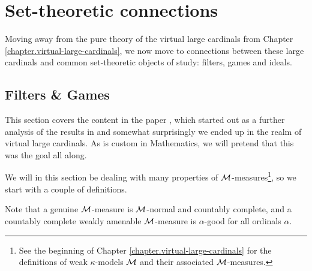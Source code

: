 \documentclass[../../main]{subfiles}
\begin{document}
\chapter{Set-theoretic connections}
\label{chapter.set-theoretic-connections}
\thispagestyle{fancy}

Moving away from the pure theory of the virtual large cardinals from Chapter \ref{chapter.virtual-large-cardinals}, we now move to connections between these large cardinals and common set-theoretic objects of study: filters, games and ideals.

\section{Filters \& Games}

This section covers the content in the paper \cite{NielsenWelch}, which started out as a further analysis of the results in \cite{HolySchlicht} and somewhat surprisingly we ended up in the realm of virtual large cardinals. As is custom in Mathematics, we will pretend that this was the goal all along.

\qquad We will in this section be dealing with many properties of $\operatorname{\mathcal M}$-measures\footnote{See the beginning of Chapter \ref{chapter.virtual-large-cardinals} for the definitions of weak $\kappa$-models $\operatorname{\mathcal M}$ and their associated $\operatorname{\mathcal M}$-measures.}, so we start with a couple of definitions.


Note that a genuine $\operatorname{\mathcal M}$-measure is $\operatorname{\mathcal M}$-normal and countably complete, and a countably complete weakly amenable $\operatorname{\mathcal M}$-measure is $\alpha$-good for all ordinals $\alpha$. 
\end{document}
